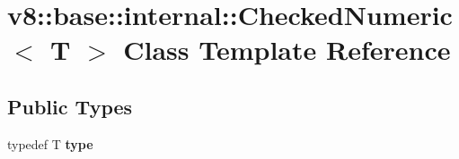 \hypertarget{classv8_1_1base_1_1internal_1_1CheckedNumeric}{}\section{v8\+:\+:base\+:\+:internal\+:\+:Checked\+Numeric$<$ T $>$ Class Template Reference}
\label{classv8_1_1base_1_1internal_1_1CheckedNumeric}
\subsection*{Public Types}
\begin{DoxyCompactItemize}
\item 
\mbox{\label{classv8_1_1base_1_1internal_1_1CheckedNumeric_a86b38431f32eef8bb1089c7e5677fcf9}} 
typedef T {\bfseries type}
\end{DoxyCompactItemize}
